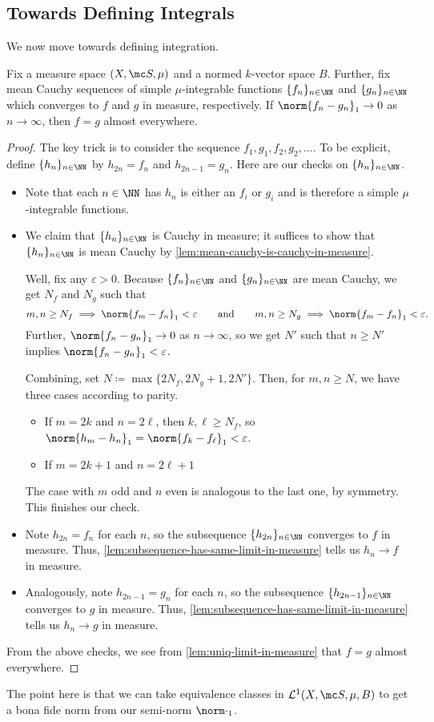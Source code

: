 \documentclass[../notes.tex]{subfiles}
\begin{document}
\subsection{Towards Defining Integrals}
We now move towards defining integration.
\begin{lemma}
	Fix a measure space $(X,\mc S,\mu)$ and a normed $k$-vector space $B$. Further, fix mean Cauchy sequences of simple $\mu$-integrable functions $\{f_n\}_{n\in\NN}$ and $\{g_n\}_{n\in\NN}$ which converges to $f$ and $g$ in measure, respectively. If $\norm{f_n-g_n}_1\to0$ as $n\to\infty$, then $f=g$ almost everywhere.
\end{lemma}
\begin{proof}
	The key trick is to consider the sequence $f_1,g_1,f_2,g_2,\ldots$. To be explicit, define $\{h_n\}_{n\in\NN}$ by $h_{2n}=f_n$ and $h_{2n-1}=g_n$. Here are our checks on $\{h_n\}_{n\in\NN}$.
	\begin{itemize}
		\item Note that each $n\in\NN$ has $h_n$ is either an $f_i$ or $g_i$ and is therefore a simple $\mu$-integrable functions.
		\item We claim that $\{h_n\}_{n\in\NN}$ is Cauchy in measure; it suffices to show that $\{h_n\}_{n\in\NN}$ is mean Cauchy by \autoref{lem:mean-cauchy-is-cauchy-in-measure}.

		Well, fix any $\varepsilon>0$. Because $\{f_n\}_{n\in\NN}$ and $\{g_n\}_{n\in\NN}$ are mean Cauchy, we get $N_f$ and $N_g$ such that
		\[m,n\ge N_f\implies\norm{f_m-f_n}_1<\varepsilon\qquad\text{and}\qquad m,n\ge N_g\implies\norm{f_m-f_n}_1<\varepsilon.\]
		Further, $\norm{f_n-g_n}_1\to0$ as $n\to\infty$, so we get $N'$ such that $n\ge N'$ implies $\norm{f_n-g_n}_1<\varepsilon$.

		Combining, set $N\coloneqq\max\{2N_f,2N_g+1,2N'\}$. Then, for $m,n\ge N$, we have three cases according to parity.
		\begin{itemize}
			\item If $m=2k$ and $n=2\ell$, then $k,\ell\ge N_f$, so $\norm{h_m-h_n}_1=\norm{f_k-f_\ell}_1<\varepsilon$.
			\item If $m=2k+1$ and $n=2\ell+1$
		\end{itemize}
		The case with $m$ odd and $n$ even is analogous to the last one, by symmetry. This finishes our check.
		\item Note $h_{2n}=f_n$ for each $n$, so the subsequence $\{h_{2n}\}_{n\in\NN}$ converges to $f$ in measure. Thus, \autoref{lem:subsequence-has-same-limit-in-measure} tells us $h_n\to f$ in measure.
		\item Analogously, note $h_{2n-1}=g_n$ for each $n$, so the subsequence $\{h_{2n-1}\}_{n\in\NN}$ converges to $g$ in measure. Thus, \autoref{lem:subsequence-has-same-limit-in-measure} tells us $h_n\to g$ in measure.
	\end{itemize}
	From the above checks, we see from \autoref{lem:uniq-limit-in-measure} that $f=g$ almost everywhere.
\end{proof}
The point here is that we can take equivalence classes in $\mathcal L^1(X,\mc S,\mu,B)$ to get a bona fide norm from our semi-norm $\norm\cdot_1$.
\end{document}
